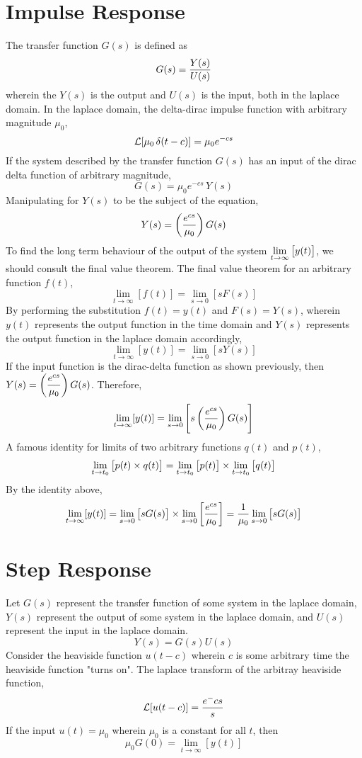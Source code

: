 \documentclass[class=report, 12pt, crop=false]{standalone}
\begin{document}
\begin{center}
\section{Impulse Response}
\begin{comment}
\end{comment}
The transfer function $G(s)$ is defined as 
$$G(s) = \frac{Y(s)}{U(s)}$$
wherein the $Y(s)$ is the output and $U(s)$ is the input, both in the laplace domain. In the laplace domain, the delta-dirac impulse function with arbitrary magnitude $\mu_0$,
$$\mathcal{L}[\mu_0\,\delta(t-c)] = \mu_0e^{-cs}$$
If the system described by the transfer function $G(s)$ has an input of the dirac delta function of arbitrary magnitude,
$$G(s) = \mu_0e^{-cs}\,Y(s)$$
Manipulating for $Y(s)$ to be the subject of the equation,
$$Y(s) = \left(\frac{e^{cs}}{\mu_0}\right)G(s)$$
To find the long term behaviour of the output of the system $\displaystyle{\lim_{t\to\infty}\left[y(t)\right]}$, we should consult the final value theorem. The final value theorem for an arbitrary function $f(t)$,
$$\lim_{t\to\infty}[f(t)] = \lim_{s\to0}[sF(s)]$$
By performing the substitution $f(t) = y(t)$ and $F(s) = Y(s)$, wherein $y(t)$ represents the output function in the time domain and $Y(s)$ represents the output function in the laplace domain accordingly,
$$\lim_{t\to\infty}[y(t)] = \lim_{s\to0}[sY(s)]$$
If the input function is the dirac-delta function as shown previously, then $\displaystyle{Y(s) = \left(\frac{e^{cs}}{\mu_0}\right)G(s)}$. Therefore,
$$\lim_{t\to\infty}[y(t)] = \lim_{s\to0}\left[s\left(\frac{e^{cs}}{\mu_0}\right)G(s)\right]$$
A famous identity for limits of two arbitrary functions $q(t)$ and $p(t)$,
$$\lim_{t\to t_0}\left[p(t)\times q(t)\right] = \lim_{t\to t_0}\left[p(t)\right]\times \lim_{t\to t_0}\left[q(t)\right]$$
By the identity above,
$$\lim_{t\to\infty}[y(t)] = \lim_{s\to0}\left[sG(s)\right] \times \lim_{s\to0}\left[\frac{e^{cs}}{\mu_0}\right] = \frac{1}{\mu_0}\lim_{s\to0}\left[sG(s)\right]$$
\section{Step Response}
\begin{comment}
\end{comment}
Let $G(s)$ represent the transfer function of some system in the laplace domain, $Y(s)$ represent the output of some system in the laplace domain, and $U(s)$ represent the input in the laplace domain.
$$Y(s) = G(s)U(s)$$
Consider the heaviside function $u(t-c)$ wherein $c$ is some arbitrary time the heaviside function "turns on". The laplace transform of the arbitray heaviside function,
$$\mathcal{L}[u(t-c)] = \frac{e^-cs}{s}$$
If the input $u(t) = \mu_0$ wherein $\mu_0$ is a constant for all $t$, then
$$\mu_0G(0) = \lim_{t\to\infty}[y(t)]$$

\end{center}
\end{document}

